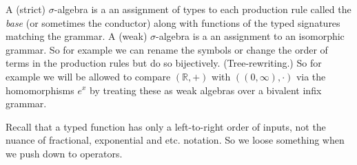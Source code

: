 A (strict) $\sigma$-algebra is a an assignment of 
types to each production rule called the \emph{base}
(or sometimes the conductor)
along with functions of the typed signatures matching the grammar.
A (weak) $\sigma$-algebra is a an assignment to an isomorphic grammar.
So for example we can rename the symbols or change the order of terms in the 
production rules but do so bijectively.  (Tree-rewriting.)  So for example 
we will be allowed to compare $(\mathbb{R},+)$ with $((0,\infty),\cdot)$
via the homomorphisms $e^x$ by treating these as weak algebras over a 
bivalent infix grammar.



Recall that a typed function has only a left-to-right order of inputs, not 
the nuance of fractional, exponential and etc. notation.  So we loose 
something when we push down to operators.  